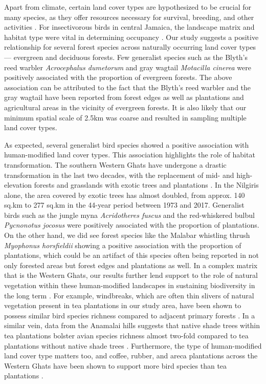 Apart from climate, certain land cover types are hypothesized to be crucial for many species, as they offer resources necessary for survival, breeding, and other activities \citep{sunarto2012}.
For insectivorous birds in central Jamaica, the landscape matrix and habitat type were vital in determining occupancy \citep{kennedy2011}.
Our study suggests a positive relationship for several forest species across naturally occurring land cover types --- evergreen and deciduous forests.
Few generalist species such as the Blyth's reed warbler \textit{Acrocephalus dumetorum} and gray wagtail \textit{Motacilla cinerea} were positively associated with the proportion of evergreen forests.
The above association can be attributed to the fact that the Blyth's reed warbler and the gray wagtail have been reported from forest edges as well as plantations and agricultural areas in the vicinity of evergreen forests.
It is also likely that our minimum spatial scale of 2.5km was coarse and resulted in sampling multiple land cover types.

As expected, several generalist bird species showed a positive association with human-modified land cover types.
This association highlights the role of habitat transformation.
The southern Western Ghats have undergone a drastic transformation in the last two decades, with the replacement of mid- and high-elevation forests and grasslands with exotic trees and plantations \citep{arasumani2018}.
In the Nilgiris alone, the area covered by exotic trees has almost doubled, from approx.
140 sq.km to 277 sq.km in the 44-year period between 1973 and 2017.
Generalist birds such as the jungle myna \textit{Acridotheres fuscus} and the red-whiskered bulbul \textit{Pycnonotus jocosus} were positively associated with the proportion of plantations.
On the other hand, we did see forest species like the Malabar whistling thrush \textit{Myophonus horsfieldii} showing a positive association with the proportion of plantations, which could be an artifact of this species often being reported in not only forested areas but forest edges and plantations as well.
In a complex matrix that is the Western Ghats, our results further lend support to the role of natural vegetation within these human-modified landscapes in sustaining biodiversity in the long term \citep{anand2010,ranganathan2010}.
For example, windbreaks, which are often thin slivers of natural vegetation present in tea plantations in our study area, have been shown to possess similar bird species richness compared to adjacent primary forests \citep{sreekar2013}.
In a similar vein, data from the Anamalai hills suggests that native shade trees within tea plantations bolster avian species richness almost two-fold compared to tea plantations without native shade trees \citep{raman2021}.
Furthermore, the type of human-modified land cover type matters too, and coffee, rubber, and areca plantations across the Western Ghats have been shown to support more bird species than tea plantations \citep{sidhu2010,karanth2016}.

